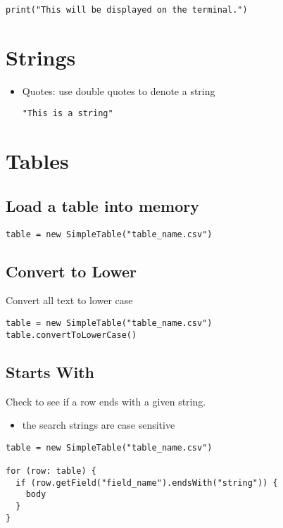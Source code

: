 \documentclass{article}
\begin{document}
\begin{lstlisting}
print("This will be displayed on the terminal.")
\end{lstlisting}

\section{Strings}

\begin{itemize}
  \item Quotes: use double quotes to denote a string
\begin{lstlisting}
"This is a string"
\end{lstlisting}

\end{itemize}

\section{Tables}

\subsection{Load a table into memory}
\begin{lstlisting}
table = new SimpleTable("table_name.csv")
\end{lstlisting}

\subsection{Convert to Lower}
Convert all text to lower case
\begin{lstlisting}
table = new SimpleTable("table_name.csv")
table.convertToLowerCase()
\end{lstlisting}

\subsection{Starts With}
Check to see if a row ends with a given string.
\begin{itemize}
  \item the search strings are case sensitive
\end{itemize}
\begin{lstlisting}
table = new SimpleTable("table_name.csv")

for (row: table) {
  if (row.getField("field_name").endsWith("string")) {
    body
  }
}
\end{lstlisting}
\end{document}
